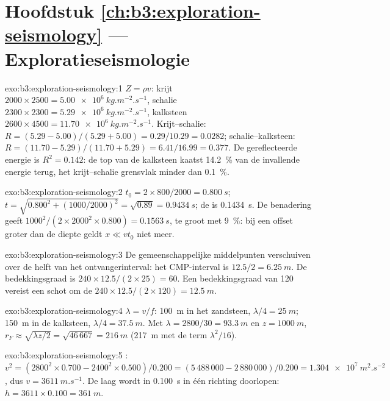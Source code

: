 \section*{Hoofdstuk \ref{ch:b3:exploration-seismology} --- Exploratieseismologie}

\begin{solution}{exo:b3:exploration-seismology:1}
$Z = \rho v$: krijt $2000\times2500 = \qty{5.00e6}{kg.m^{-2}.s^{-1}}$, schalie
$2300\times2300 = \qty{5.29e6}{kg.m^{-2}.s^{-1}}$, kalksteen $2600\times4500 =
\qty{11.70e6}{kg.m^{-2}.s^{-1}}$. Krijt--schalie: $R = (5.29 - 5.00)/(5.29 + 5.00)
= 0.29/10.29 = 0.0282$; schalie--kalksteen: $R = (11.70 - 5.29)/(11.70 + 5.29) =
6.41/16.99 = 0.377$. De gereflecteerde energie is $R^2 = 0.142$: de top van de
kalksteen kaatst \qty{14.2}{\percent} van de invallende energie terug, het krijt--schalie
grensvlak minder dan \qty{0.1}{\percent}.
\end{solution}

\begin{solution}{exo:b3:exploration-seismology:2}
$t_0 = 2\times800/2000 = \qty{0.800}{s}$; $t = \sqrt{0.800^2 + (1000/2000)^2} =
\sqrt{0.89} = \qty{0.9434}{s}$; de  is \qty{0.1434}{s}. De
benadering geeft $1000^2/(2\times2000^2\times0.800) = \qty{0.1563}{s}$, te
groot met \qty{9}{\percent}: bij een offset groter dan de diepte geldt $x \ll vt_0$ niet
meer.
\end{solution}

\begin{solution}{exo:b3:exploration-seismology:3}
De gemeenschappelijke middelpunten verschuiven over de helft van het ontvangerinterval: het CMP-interval is
$12.5/2 = \qty{6.25}{m}$. De bedekkingsgraad is $240\times12.5/(2\times25) = 60$. Een
bedekkingsgraad van 120 vereist een schot om de $240\times12.5/(2\times120) = \qty{12.5}{m}$.
\end{solution}

\begin{solution}{exo:b3:exploration-seismology:4}
$\lambda = v/f$: \qty{100}{m} in het zandsteen, $\lambda/4 = \qty{25}{m}$;
\qty{150}{m} in de kalksteen, $\lambda/4 = \qty{37.5}{m}$.
Met $\lambda = 2800/30 = \qty{93.3}{m}$ en $z = \qty{1000}{m}$,
$r_F \approx \sqrt{\lambda z/2} = \sqrt{46\,667} = \qty{216}{m}$ (\qty{217}{m}
met de term $\lambda^2/16$).
\end{solution}

\begin{solution}{exo:b3:exploration-seismology:5}
: $v^2 = (2800^2\times0.700 - 2400^2\times0.500)/0.200 = (5\,488\,000 -
2\,880\,000)/0.200 = \qty{1.304e7}{m^2.s^{-2}}$, dus $v = \qty{3611}{m.s^{-1}}$.
De laag wordt in \qty{0.100}{s} in één richting doorlopen: $h = 3611\times0.100 =
\qty{361}{m}$.
\end{solution}

